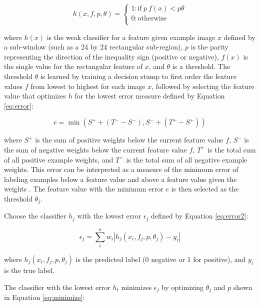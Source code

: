 \begin{equation} \label{eq:weak-classifier}
h(x, f, p, \theta) = 
\begin{cases}
  1: \text{if} \ p \ f(x) \lt p \theta \\
  0: \text{otherwise} \\
\end{cases}
\end{equation}

where $h(x)$ is the weak classifier for a feature given example image $x$ defined by a sub-window (such as a 24 by 24 rectangular sub-region), $p$ is the parity representing the direction of the inequality sign (positive or negative), $f(x)$ is the single value for the rectangular feature of $x$, and $\theta$ is a threshold. The threshold $\theta$ is learned by training a decision stump to first order the feature values $f$ from lowest to highest for each image $x$, followed by selecting the feature value that optimizes $h$ for the lowest error measure defined by Equation \ref{eq:error}:

\begin{equation} \label{eq:error}
e = \min(S^+ + (T^- - S^-), S^- + (T^+ - S^+))
\end{equation}

where $S^+$ is the sum of positive weights below the current feature value $f$, $S^-$ is the sum of negative weights below the current feature value $f$, $T^+$ is the total sum of all positive example weights, and $T^-$ is the total sum of all negative example weights. This error can be interpreted as a measure of the minimum error of labeling examples below a feature value and above a feature value given the weights \cite{Viola:2004}. The feature value with the minimum error $e$ is then selected as the threshold $\theta{_j}$.

Choose the classifier $h_j$ with the lowest error $\epsilon_j$ defined by Equation \ref{eq:error2}:
    
\begin{equation} \label{eq:error2}
\epsilon_j = \sum_i^n{w_i \left\lvert h_j(x_i, f_j, p, \theta_j) - y_i \right\rvert}
\end{equation}

where $h_j(x_i, f_j, p, \theta_j)$ is the predicted label (0 negative or 1 for positive), and $y_i$ is the true label. 

The classifier with the lowest error $h_t$ minimizes $\epsilon_j$ by optimizing $\theta_j$ and $p$ shown in Equation  \ref{eq:minimize}:

